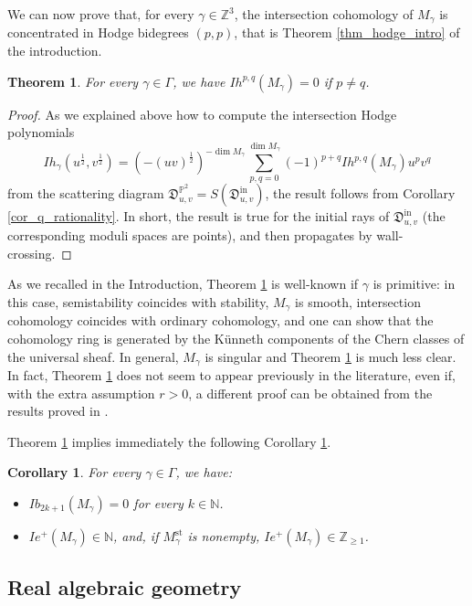 \documentclass[12pt, a4paper]{amsart}
\newtheorem{thm}[defn]{Theorem}
\newtheorem{cor}[defn]{Corollary}
\newcommand\NN{\mathbb N}
\newcommand\PP{\mathbb P}
\newcommand\Z{\mathbb Z}
\newcommand\fD{\mathfrak D}
\newcommand\st{\mathrm{st}}
\newcommand\iin{\mathrm{in}}
\begin{document}
We can now prove that, for every $\gamma \in \Z^3$, the intersection cohomology of $M_\gamma$ is concentrated in Hodge bidegrees $(p,p)$, that is Theorem 
\ref{thm_hodge_intro} of the introduction.

\begin{thm} \label{thm_hodge}
For every $\gamma \in \Gamma$, we have $Ih^{p,q}(M_\gamma)=0$ if $p \neq q$.
\end{thm}

\begin{proof}
As we explained above how to compute 
the intersection Hodge 
polynomials
\[Ih_\gamma(u^{\frac{1}{2}},v^{\frac{1}{2}}) =
(-(uv)^{\frac{1}{2}})^{- \dim M_\gamma}
\sum_{p,q=0}^{\dim M_\gamma}
(-1)^{p+q}
Ih^{p,q}(M_\gamma) u^p v^q \]
from the scattering diagram $\fD_{u,v}^{\PP^2}=S(\fD^\iin_{u,v})$, the result follows from Corollary 
\ref{cor_q_rationality}. In short, the result is true for the initial rays of $\fD^\iin_{u,v}$ (the corresponding moduli spaces are points), and then propagates by wall-crossing.
\end{proof}

As we recalled in the Introduction, Theorem \ref{thm_hodge} is well-known
 \cite{MR1228610, MR1351502, MR2304330} if $\gamma$ is primitive: in this case, semistability coincides with stability,
$M_\gamma$ is smooth, intersection cohomology coincides with ordinary cohomology, and one can show that the cohomology ring is generated by the Künneth components of the Chern classes of the universal sheaf. In general, $M_\gamma$ is singular and Theorem \ref{thm_hodge}
is much less clear. In fact, Theorem 
\ref{thm_hodge} does not seem to appear previously in the 
literature, 
even if, with the extra assumption $r>0$, a different proof can be obtained from the results proved in \cite{MR3874687}.

Theorem \ref{thm_hodge} implies immediately the following Corollary
\ref{cor_hodge}.

\begin{cor}\label{cor_hodge}
For every $\gamma \in \Gamma$, we have:
\begin{itemize}
\item[(i)] $Ib_{2k+1}(M_\gamma)=0$ for every $k \in \NN$.
\item[(ii)] $Ie^+(M_\gamma) \in \NN$, and, if 
$M_\gamma^\st$ is nonempty, $Ie^+(M_\gamma)
\in \Z_{\geqslant 1}$.
\end{itemize}
\end{cor}

\subsection{Real algebraic geometry}
\label{section_real_moduli}
\end{document}
